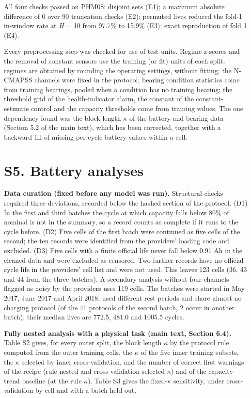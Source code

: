 \documentclass[11pt,a4paper]{article}
\begin{document}
\noindent All four checks passed on PHM08: disjoint sets (E1); a maximum absolute difference of 0 over 90 truncation checks (E2); permuted lives reduced the fold-1 in-window rate at \textit{H} = 10 from 97.7\% to 15.9\% (E3); exact reproduction of fold 1 (E4).

\noindent Every preprocessing step was checked for use of test units. Regime z-scores and the removal of constant sensors use the training (or fit) units of each split; regimes are obtained by rounding the operating settings, without fitting; the N-CMAPSS channels were fixed in the protocol; bearing condition statistics come from training bearings, pooled when a condition has no training bearing; the threshold grid of the health-indicator alarm, the constant of the constant-estimate control and the capacity thresholds come from training values. The one dependency found was the block length $\kappa$ of the battery and bearing data (Section 5.2 of the main text), which has been corrected, together with a backward fill of missing per-cycle battery values within a cell.

\section*{S5. Battery analyses}

\noindent \textbf{Data curation (fixed before any model was run).} Structural checks required three deviations, recorded below the hashed section of the protocol. (D1) In the first and third batches the cycle at which capacity falls below 80\% of nominal is not in the summary, so a record counts as complete if it runs to the cycle before. (D2) Five cells of the first batch were continued as five cells of the second; the ten records were identified from the providers' loading code and excluded. (D3) Five cells with a finite official life never fall below 0.91 Ah in the cleaned data and were excluded as censored. Two further records have no official cycle life in the providers' cell list and were not used. This leaves 123 cells (36, 43 and 44 from the three batches). A secondary analysis without four channels flagged as noisy by the providers uses 119 cells. The batches were started in May 2017, June 2017 and April 2018, used different rest periods and share almost no charging protocol (of the 41 protocols of the second batch, 2 occur in another batch); their median lives are 772.5, 481.0 and 1005.5 cycles.

\noindent \textbf{Fully nested analysis with a physical task (main text, Section 6.4).} Table S2 gives, for every outer split, the block length $\kappa$ by the protocol rule computed from the outer training cells, the $\kappa$ of the five inner training subsets, the $\kappa$ selected by inner cross-validation, and the number of correct first warnings of the recipe (rule-nested and cross-validation-selected $\kappa$) and of the capacity-trend baseline (at the rule $\kappa$). Table S3 gives the fixed-$\kappa$ sensitivity, under cross-validation by cell and with a batch held out.
\end{document}
